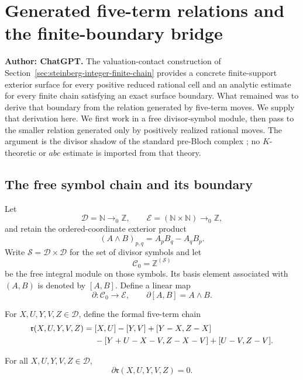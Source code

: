\section{Generated five-term relations and the finite-boundary bridge}
\label{sec:steinberg-five-term-boundary-bridge}

\noindent\textbf{Author: ChatGPT.}
The valuation-contact construction of
Section~\ref{sec:steinberg-integer-finite-chain} provides a concrete
finite-support exterior surface for every positive reduced rational cell and
an analytic estimate for every finite chain satisfying an exact surface
boundary.  What remained was to derive that boundary from the relation
generated by five-term moves.  We supply that derivation here.  We first work
in a free divisor-symbol module, then pass to the smaller relation generated
only by positively realized rational moves.  The argument is the divisor
shadow of the standard pre-Bloch complex
\cite{DupontSah1982,Suslin1991,GoetteZickert2007}; no $K$-theoretic or
$abc$ estimate is imported from that theory.

\subsection{The free symbol chain and its boundary}

Let
\[
 \mathcal D=\mathbb N\to_0\mathbb Z,
 \qquad
 \mathcal E=(\mathbb N\times\mathbb N)\to_0\mathbb Z,
\]
and retain the ordered-coordinate exterior product
\[
 (A\wedge B)_{p,q}=A_pB_q-A_qB_p.
\]
Write $\mathcal S=\mathcal D\times\mathcal D$ for the set of divisor
symbols and let
\[
 \mathcal C_0=\mathbb Z^{(\mathcal S)}
\]
be the free integral module on those symbols.  Its basis element associated
with $(A,B)$ is denoted by $[A,B]$.  Define a linear map
\begin{equation}
 \partial:\mathcal C_0\longrightarrow\mathcal E,
 \qquad \partial[A,B]=A\wedge B.
 \label{eq:sftbb-boundary}
\end{equation}

For $X,U,Y,V,Z\in\mathcal D$, define the formal five-term chain
\begin{align}
 \mathfrak r(X,U,Y,V,Z)={}&[X,U]-[Y,V]+[Y-X,Z-X]\notag\\
 &-[Y+U-X-V,Z-X-V]+[U-V,Z-V].
 \label{eq:sftbb-five-chain}
\end{align}

\begin{theorem}
\label{thm:sftbb-generator-cycle}
For all $X,U,Y,V,Z\in\mathcal D$,
\[
 \partial\mathfrak r(X,U,Y,V,Z)=0.
\]
\end{theorem}

